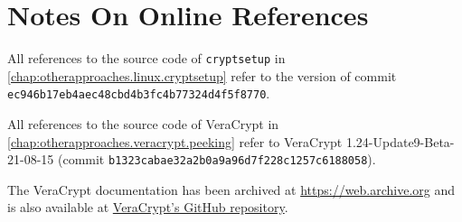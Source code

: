 \chapter{Notes On Online References}
\label{app:onlinereferences}
All references to the source code of \texttt{cryptsetup} in \autoref{chap:otherapproaches.linux.cryptsetup} refer to the version of commit \texttt{ec946b17eb4aec48cbd4b3fc4b77324d4f5f8770}.

All references to the source code of VeraCrypt in \autoref{chap:otherapproaches.veracrypt.peeking} refer to VeraCrypt 1.24-Update9-Beta-21-08-15 (commit \texttt{b1323cabae32a2b0a9a96d7f228c1257c6188058}).

The VeraCrypt documentation \cite{Veracrypt} has been archived at \url{https://web.archive.org} and is also available at \href{https://github.com/veracrypt/VeraCrypt}{VeraCrypt's GitHub repository}.

